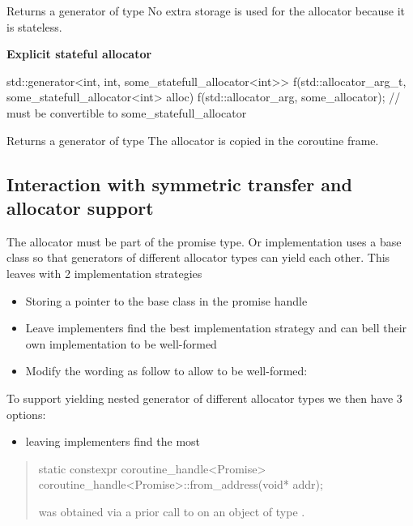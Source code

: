 \documentclass{wg21}
\begin{document}
Returns a generator of type 
No extra storage is used for the allocator because it is stateless.

\textbf{Explicit stateful allocator}

\begin{colorblock}
std::generator<int, int, some_statefull_allocator<int>> 
    f(std::allocator_arg_t,  some_statefull_allocator<int> alloc) {}
f(std::allocator_arg, some_allocator); // must be convertible to some_statefull_allocator
\end{colorblock}

Returns a generator of type 
The allocator is copied in the coroutine frame.


\subsection{Interaction with symmetric transfer and allocator support}

The allocator must be part of the promise type.
Or implementation uses a base class so that generators of different allocator types can yield each other.
This leaves with 2 implementation strategies
\begin{itemize}
\item Storing a pointer to the base class in the promise handle
\item Leave implementers find the best implementation strategy and can bell their own implementation to be well-formed
\item Modify the wording as follow to allow  to be well-formed:
\end{itemize}

To support yielding nested generator of different allocator types we then have 3 options:
\begin{itemize}
\item leaving implementers find the most
\end{itemize}

\begin{quote}
%
\begin{itemdecl}
static constexpr coroutine_handle<Promise> coroutine_handle<Promise>::from_address(void* addr);
\end{itemdecl}

\begin{itemdescr}
\expects
{} was obtained via a prior call to 
on an object of type \cv {}.
\end{itemdescr}
\end{quote}
\end{document}
